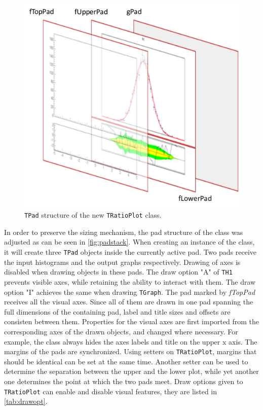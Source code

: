 \begin{figure}
  \centering
  \includegraphics[width=1.0\linewidth]{assets/padstack.pdf}
  \caption{\texttt{TPad} structure of the new \texttt{TRatioPlot} class.}
  \label{fig:padstack}
\end{figure}

In order to preserve the sizing mechanism, the pad structure of the class was adjusted as can be seen
in \autoref{fig:padstack}. When creating
an instance of the class, it will create three \texttt{TPad} objects inside the currently active pad.
Two pads receive the input histograms and the output graphs respectively. Drawing of axes is disabled
when drawing objects in these pads. The draw option "A" of \texttt{TH1} prevents visible axes, while
retaining the ability to interact with them. The draw option "I" achieves the same when drawing
\texttt{TGraph}. The pad marked by \emph{fTopPad} receives all the visual axes. Since all of them are drawn
in one pad spanning the full dimensions of the containing pad, label and title sizes and offsets are consisten
between them. Properties for the visual axes are first imported from the corresponding axes of the drawn
objects, and changed where necessary. For example, the class always hides the axes labels and title on the upper x axis. The margins of the pads are synchronized. Using setters on \texttt{TRatioPlot}, margins that
should be identical can be set at the same time. Another setter can be used to determine the separation
between the upper and the lower plot, while yet another one determines the point at which the two pads
meet. Draw options given to \texttt{TRatioPlot} can enable and disable visual features, they are listed
in \autoref{tab:drawopt}.


